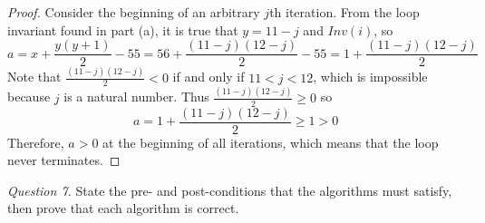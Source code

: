 \documentclass[11pt]{article}
\begin{document}
\begin{enumerate}
\begin{proof}
            Consider the beginning of an arbitrary \(j\)th iteration. From the loop invariant found in part (a), it is true that \(y = 11 - j\) and \(Inv(i)\), so
            \[
                a = x + \frac{y(y+1)}{2} - 55 = 56 + \frac{(11-j)(12-j)}{2} - 55 = 1 + \frac{(11-j)(12-j)}{2}
            \]
            Note that \(\frac{(11-j)(12-j)}{2} < 0\) if and only if \(11 < j < 12\), which is impossible because \(j\) is a natural number. Thus \(\frac{(11-j)(12-j)}{2} \geq 0\) so
            \[
                a = 1 + \frac{(11-j)(12-j)}{2} \geq 1 > 0
            \]
            Therefore, \(a >0\) at the beginning of all iterations, which means that the loop never terminates.

        \end{proof}
    \end{enumerate}
    \noindent\textit{Question 7.} State the pre- and post-conditions that the algorithms must satisfy, then prove that each algorithm is correct.
\end{document}
